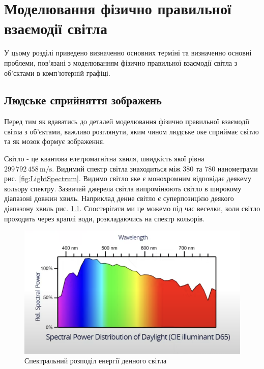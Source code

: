 

 \setcounter{chapter}{0}
 \chapter{Моделювання фізично правильної взаємодії світла }

 
 \par У цьому розділі приведено визначенно основних терміні та визначенно основні проблеми, пов'язані з моделюванням фізично правильної взаємодії світла з 
      об'єктами в комп'ютерній графіці. 

 \section{Людське сприйняття зображень}
  \setcounter{equation}{0}
 \setcounter{theorem}{0}

 \par Перед тим як вдаватись до деталей моделювання фізично правильної взаємодії світла з об'єктами, важливо розглянути, 
 яким чином людське оке сприймає світло та як мозок формує зображення.
 \par Світло - це квантова елетромагнітна хвиля, швидкість якої рівна \\ $299\,792\,458\,\text{m/s}$. Видимий спектр світла знаходиться між 
 380 та 780 наномет\-рами рис. \ref{fig:LightSpectrum}. Видимо світло яке є монохромним відповідає деякему кольору спектру. Зазвичай джерела світла випромінюють 
 світло в широкому діапазоні довжин хвиль. Наприклад денне світло є суперпозицією деякого діапазону хвиль рис. \ref{fig:LightSuper}.
Спостерігати ми це можемо під час веселки, коли світло проходить через краплі води, розкладаючись на спектр кольорів.

 \begin{figure}[h]
  \centering
  \includegraphics[scale=1]{Pictures/LightSuper.png}
  \caption{Спектральний розподіл енергії денного світла}
  \label{fig:LightSuper}
\end{figure}


